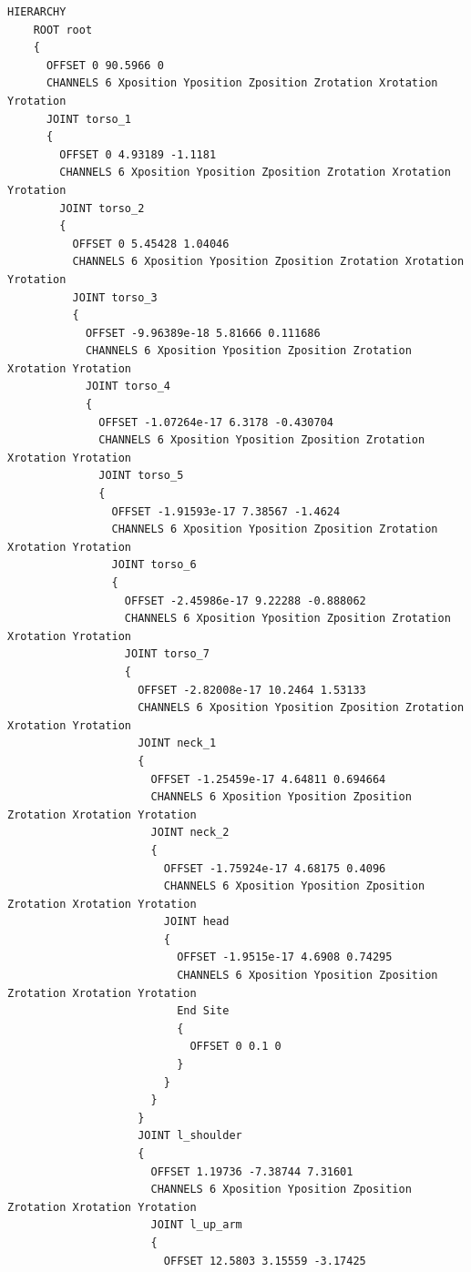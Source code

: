 \documentclass[a4j, fleqn, 12pt]{jsreport}
\begin{document}
\begin{lstlisting}[caption=mocopiのBVHファイル,label=BVH]
    HIERARCHY
    ROOT root
    {
      OFFSET 0 90.5966 0 
      CHANNELS 6 Xposition Yposition Zposition Zrotation Xrotation Yrotation
      JOINT torso_1
      {
        OFFSET 0 4.93189 -1.1181
        CHANNELS 6 Xposition Yposition Zposition Zrotation Xrotation Yrotation
        JOINT torso_2
        {
          OFFSET 0 5.45428 1.04046
          CHANNELS 6 Xposition Yposition Zposition Zrotation Xrotation Yrotation
          JOINT torso_3
          {
            OFFSET -9.96389e-18 5.81666 0.111686
            CHANNELS 6 Xposition Yposition Zposition Zrotation Xrotation Yrotation
            JOINT torso_4
            {
              OFFSET -1.07264e-17 6.3178 -0.430704
              CHANNELS 6 Xposition Yposition Zposition Zrotation Xrotation Yrotation
              JOINT torso_5
              {
                OFFSET -1.91593e-17 7.38567 -1.4624
                CHANNELS 6 Xposition Yposition Zposition Zrotation Xrotation Yrotation
                JOINT torso_6
                {
                  OFFSET -2.45986e-17 9.22288 -0.888062
                  CHANNELS 6 Xposition Yposition Zposition Zrotation Xrotation Yrotation
                  JOINT torso_7
                  {
                    OFFSET -2.82008e-17 10.2464 1.53133
                    CHANNELS 6 Xposition Yposition Zposition Zrotation Xrotation Yrotation
                    JOINT neck_1
                    {
                      OFFSET -1.25459e-17 4.64811 0.694664
                      CHANNELS 6 Xposition Yposition Zposition Zrotation Xrotation Yrotation
                      JOINT neck_2
                      {
                        OFFSET -1.75924e-17 4.68175 0.4096
                        CHANNELS 6 Xposition Yposition Zposition Zrotation Xrotation Yrotation
                        JOINT head
                        {
                          OFFSET -1.9515e-17 4.6908 0.74295
                          CHANNELS 6 Xposition Yposition Zposition Zrotation Xrotation Yrotation
                          End Site
                          {
                            OFFSET 0 0.1 0
                          }
                        }
                      }
                    }
                    JOINT l_shoulder
                    {
                      OFFSET 1.19736 -7.38744 7.31601
                      CHANNELS 6 Xposition Yposition Zposition Zrotation Xrotation Yrotation
                      JOINT l_up_arm
                      {
                        OFFSET 12.5803 3.15559 -3.17425

\end{lstlisting}
\end{document}
